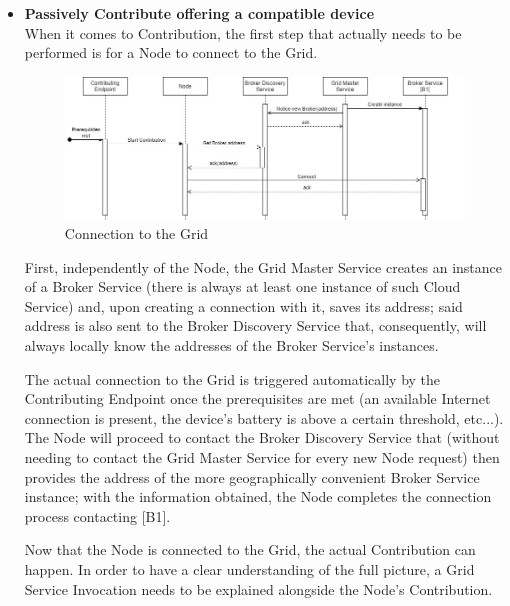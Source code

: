 \begin{itemize}
\begin{itemize}
    \end{itemize}

    \item \textbf{Passively Contribute offering a compatible device}\\
    When it comes to Contribution, the first step that actually needs to be performed is for a Node to connect to the Grid.
    \vspace{12mm}
    \begin{figure}[!ht]
        \centering
        \includegraphics[width=\linewidth]{document/chapters/chapter_5/images/use_cases_satisfaction_node_grid_connection.jpg}
        \caption{Connection to the Grid}
        \label{fig:use_cases_satisfaction_node_grid_connection}
    \end{figure}
    \vspace{5mm}

    First, independently of the Node, the Grid Master Service creates an instance of a Broker Service (there is always at least one instance of such Cloud Service) and, upon creating a connection with it, saves its address; said address is also sent to the Broker Discovery Service that, consequently, will always locally know the addresses of the Broker Service's instances.

    The actual connection to the Grid is triggered automatically by the Contributing Endpoint once the prerequisites are met (an available Internet connection is present, the device's battery is above a certain threshold, etc...). The Node will proceed to contact the Broker Discovery Service that (without needing to contact the Grid Master Service for every new Node request) then provides the address of the more geographically convenient Broker Service instance; with the information obtained, the Node completes the connection process contacting [B1]. 

    Now that the Node is connected to the Grid, the actual Contribution can happen. In order to have a clear understanding of the full picture, a Grid Service Invocation needs to be explained alongside the Node's Contribution.
    \vspace{10mm}


\end{itemize}
